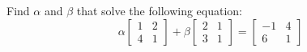 Find $\alpha$ and $\beta$ that solve the following equation:
%
\begin{equation*}
\alpha\begin{bmatrix} 1 & 2 \\ 4 & 1 \end{bmatrix} +
\beta\begin{bmatrix} 2 & 1 \\ 3 & 1 \end{bmatrix} 
=
\begin{bmatrix} -1 & 4 \\ 6 & 1 \end{bmatrix}
\end{equation*}
%